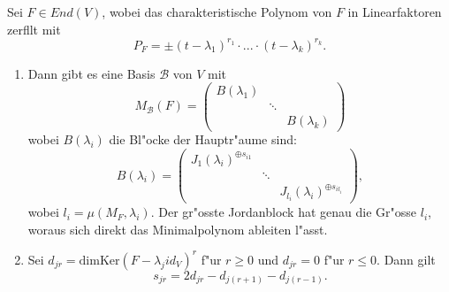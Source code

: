 \documentclass[8pt, a4paper, twocolumn, landscape]{article}
\newcommand{\comment}[1]{}
\begin{document}
\begin{theorem}
Sei $F \in End(V)$, wobei das charakteristische Polynom von $F$ in Linearfaktoren zerf\aee llt mit
$$P_F = \pm (t - \lambda_1)^{r_1} \cdot ... \cdot (t - \lambda_k)^{r_k}.$$
\begin{enumerate}
\item Dann gibt es eine Basis $\mathcal{B}$ von $V$ mit 
$$
M_\mathcal{B}(F) = \left( \begin{array}{ccc}
B(\lambda_1) & & \\ & \ddots & \\ & & B(\lambda_k)
\end{array} \right)
$$
wobei $B(\lambda_i)$ die Bl"ocke der Hauptr"aume sind:
$$
B(\lambda_i) = \left(
\begin{array}{ccc} J_1(\lambda_i)^{\oplus s_{i1}} & & \\ & \ddots & \\ & & J_{l_i}(\lambda_i)^{\oplus s_{il_i}}
\end{array}
\right),
$$
wobei $l_i = \mu (M_F, \lambda_i)$. Der gr"osste Jordanblock hat genau die Gr"osse $l_i$, woraus sich direkt das Minimalpolynom ableiten l"asst.
\item Sei $d_{jr} = \mathrm{dim}\mathrm{Ker}(F - \lambda_j id_V)^r$ f"ur $r \geq 0$ und $d_{jr} = 0$ f"ur $r \leq 0$. Dann gilt
$$
s_{jr} = 2d_{jr} - d_{j(r + 1)} - d_{j(r-1)}.
$$
\comment{
$M_\mathcal{B}(F) = 
\left(\begin{array}{ccc}
\lambda_{1} E_{r_{1}}+N_{1} & & 0 
\\ & \ddots &  
\\ 0 & & \lambda_{k} E_{r_{k}}+N_{k}
\end{array}\right).$
\\ $\lambda_i E_{r_i} + N_i = \left(\begin{array}{ccc}
B_{1, d_1} & & 0 
\\ & \ddots &  
\\ 0 & & B_{1, d_2}
\end{array}\right)$
 besteht dabei aus Jordanbl\oee cken, welche diese Form haben:
\\ \centerline{$B_{i, d} = \left(\begin{array}{cccc}\lambda_{i} & 1 & & 
\\ & \ddots & \ddots & 
\\ & & \ddots & 1 
\\ & & & \lambda_{i}\end{array}\right). \in M( r_i \times r_i, K)$}


}
\end{enumerate}
\end{theorem}
\end{document}
